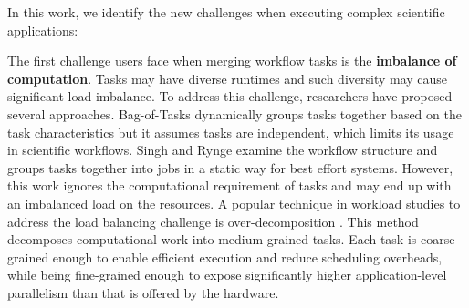 


In this work, we identify the new challenges when executing complex scientific applications:

The first challenge users face when merging workflow tasks is the \textbf{imbalance of computation}. Tasks may have diverse runtimes and such diversity may cause significant load imbalance. To address this challenge, researchers have proposed several approaches. Bag-of-Tasks \cite{Hussin2010, Celaya2010, Oprescu2010} dynamically groups tasks together based on the task characteristics but it assumes tasks are independent, which limits its usage in scientific workflows. Singh \cite{Singh2008} and Rynge \cite{Rynge2012} examine the workflow structure and groups tasks together into jobs in a static way for best effort systems. However, this work ignores the computational requirement of tasks and may end up with an imbalanced load on the resources. A popular technique in workload studies to address the load balancing challenge is over-decomposition \cite{Lifflander2012}. This method decomposes computational work into medium-grained tasks. Each task is coarse-grained enough to enable efficient execution and reduce scheduling overheads, while being fine-grained enough to expose significantly higher application-level parallelism than that is offered by the hardware. 


